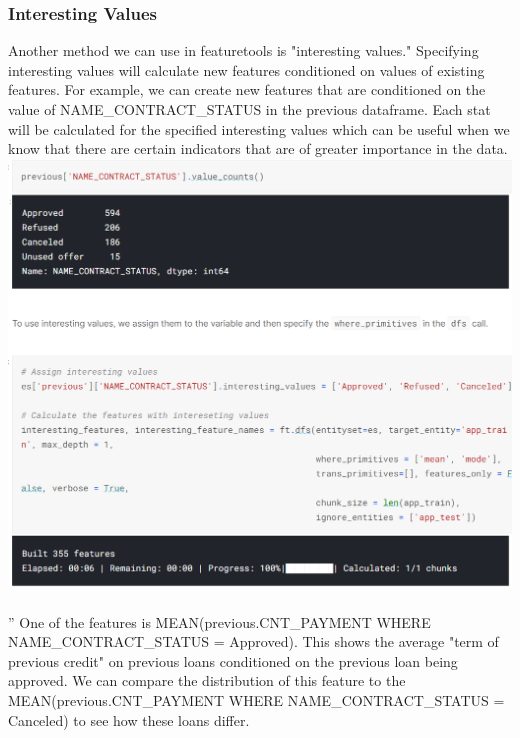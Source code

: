 \documentclass[twoside,a4paper]{article}
\begin{document}
\subsubsection{Interesting Values}
Another method we can use in featuretools is "interesting values." Specifying interesting values will calculate new features conditioned on values of existing features. For example, we can create new features that are conditioned on the value of NAME\_CONTRACT\_STATUS in the previous dataframe. Each stat will be calculated for the specified interesting values which can be useful when we know that there are certain indicators that are of greater importance in the data.\\
\includegraphics[scale=.8]{23.png}\\\\''
One of the features is MEAN(previous.CNT\_PAYMENT WHERE NAME\_CONTRACT\_STATUS = Approved). This shows the average "term of previous credit" on previous loans conditioned on the previous loan being approved. We can compare the distribution of this feature to the MEAN(previous.CNT\_PAYMENT WHERE NAME\_CONTRACT\_STATUS = Canceled) to see how these loans differ.\\
\end{document}
